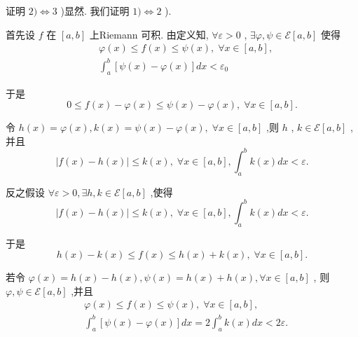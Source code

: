 证明 $2) \Leftrightarrow  3$ )显然. 我们证明 $1) \Leftrightarrow  2$ ).

首先设 $f$ 在 $\left\lbrack  {a,b}\right\rbrack$ 上Riemann 可积. 由定义知, $\forall \varepsilon  > 0$ , $\exists \varphi ,\psi  \in  \mathcal{E}\left\lbrack  {a,b}\right\rbrack$ 使得
\begin{align*}
	&\varphi \left( x\right)  \leq  f\left( x\right)  \leq  \psi \left( x\right) ,\;\forall x \in  \left\lbrack  {a,b}\right\rbrack  ,\\
	&{\int }_{a}^{b}\left\lbrack  {\psi \left( x\right)  - \varphi \left( x\right) }\right\rbrack  {dx} < {\varepsilon }_{0}
\end{align*}

于是
$$0 \leq  f\left( x\right)  - \varphi \left( x\right)  \leq  \psi \left( x\right)  - \varphi \left( x\right) ,\;\forall x \in  \left\lbrack  {a,b}\right\rbrack  .$$

令 $h\left( x\right)  = \varphi \left( x\right) ,k\left( x\right)  = \psi \left( x\right)  - \varphi \left( x\right) ,\;\forall x \in  \left\lbrack  {a,b}\right\rbrack$ ,则 $h$ , $k \in  \mathcal{E}\left\lbrack  {a,b}\right\rbrack$ ,并且
$$\left| {f\left( x\right)  - h\left( x\right) }\right|  \leq  k\left( x\right) ,\;\forall x \in  \left\lbrack  {a,b}\right\rbrack  ,{\int }_{a}^{b}k\left( x\right) {dx} < \varepsilon .$$

反之假设 $\forall \varepsilon  > 0,\exists h,k \in  \mathcal{E}\left\lbrack  {a,b}\right\rbrack$ ,使得
$$\left| {f\left( x\right)  - h\left( x\right) }\right|  \leq  k\left( x\right) ,\;\forall x \in  \left\lbrack  {a,b}\right\rbrack  ,{\int }_{a}^{b}k\left( x\right) {dx} < \varepsilon .$$

于是
$$h\left( x\right)  - k\left( x\right)  \leq  f\left( x\right)  \leq  h\left( x\right)  + k\left( x\right) ,\;\forall x \in  \left\lbrack  {a,b}\right\rbrack  .$$

若令 $\varphi \left( x\right)  = h\left( x\right)  - h\left( x\right) ,\psi \left( x\right)  = h\left( x\right)  + h\left( x\right) ,\forall x \in  \left\lbrack  {a,b}\right\rbrack$ , 则 $\varphi ,\psi  \in  \mathcal{E}\left\lbrack  {a,b}\right\rbrack$ ,并且
\begin{align*}
	&\varphi \left( x\right)  \leq  f\left( x\right)  \leq  \psi \left( x\right) ,\;\forall x \in  \left\lbrack  {a,b}\right\rbrack  ,\\
	&{\int }_{a}^{b}\left\lbrack  {\psi \left( x\right)  - \varphi \left( x\right) }\right\rbrack  {dx} = 2{\int }_{a}^{b}k\left( x\right) {dx} < {2\varepsilon }.
\end{align*}

